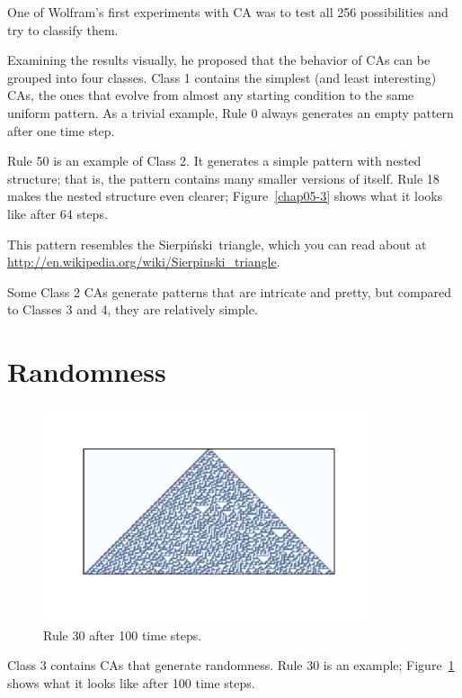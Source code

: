 \documentclass[12pt]{book}
\theoremstyle{exercise}
\begin{document}
One of Wolfram's first experiments with CA was to test all 256
possibilities and try to classify them.

Examining the results visually, he proposed that the behavior of CAs
can be grouped into four classes.  Class 1 contains the simplest (and
least interesting) CAs, the ones that evolve from almost any starting
condition to the same uniform pattern.  As a trivial example, Rule 0
always generates an empty pattern after one time step.


Rule 50 is an example of Class 2.  It generates a simple pattern with
nested structure; that is, the pattern contains many smaller versions
of itself.  Rule 18 makes the nested structure even clearer;
Figure~\ref{chap05-3} shows what it looks like after 64 steps.

 
\newcommand{\Sierpinski}{Sierpi\'{n}ski}

This pattern resembles the \Sierpinski~triangle, which
you can read about at \url{http://en.wikipedia.org/wiki/Sierpinski_triangle}.

Some Class 2 CAs generate patterns that are intricate and
pretty, but compared to Classes 3 and 4, they are relatively
simple.


\section{Randomness}

\begin{figure}
\centerline{\includegraphics[height=2.5in]{figs/chap05-4.pdf}}
\caption{Rule 30 after 100 time steps.}
\label{chap05-4}
\end{figure}

Class 3 contains CAs that generate randomness.
Rule 30 is an example; Figure~\ref{chap05-4} shows what it looks like
after 100 time steps.
\end{document}
